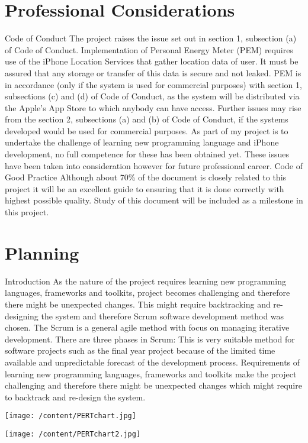 \documentclass[12pt, a4paper]{report}   %
\begin{document}
\section{Professional Considerations}
Code of Conduct
The project raises the issue set out in section 1, subsection (a) of Code of Conduct. Implementation of Personal Energy Meter (PEM) requires use of the iPhone Location Services that gather location data of user. It must be assured that any storage or transfer of this data is secure and not leaked.
PEM is in accordance (only if the system is used for commercial purposes) with section 1, subsections (c) and (d) of Code of Conduct, as the system will be distributed via the Apple’s App Store to which anybody can have access.
Further issues may rise from the section 2, subsections (a) and (b) of Code of Conduct, if the systems developed would be used for commercial purposes. As part of my project is to undertake the challenge of learning new programming language and iPhone development, no full competence for these has been obtained yet. These issues have been taken into consideration however for future professional career.
Code of Good Practice
Although about 70\% of the document is closely related to this project it will be an excellent guide to ensuring that it is done correctly with highest possible quality.
Study of this document will be included as a milestone in this project.

\section{Planning}
Introduction
As the nature of the project requires learning new programming languages, frameworks and toolkits, project becomes challenging and therefore there might be unexpected changes. This might require backtracking and re-designing the system and therefore Scrum software development method was chosen. The Scrum is a general agile method with focus on managing iterative development. There are three phases in Scrum:
This is very suitable method for software projects such as the final year project because of the limited time available and unpredictable forecast of the development process. Requirements of learning new programming languages, frameworks and toolkits make the project challenging and therefore there might be unexpected changes which might require to backtrack and re-design the system.

\texttt{[image: /content/PERTchart.jpg]}

\texttt{[image: /content/PERTchart2.jpg]}
\end{document}
